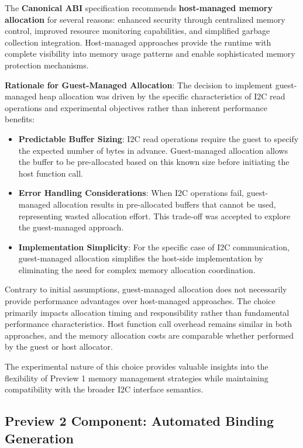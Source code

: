 The \textbf{Canonical ABI} specification recommends \textbf{host-managed memory allocation} for several reasons: enhanced security through centralized memory control, improved resource monitoring capabilities, and simplified garbage collection integration. Host-managed approaches provide the runtime with complete visibility into memory usage patterns and enable sophisticated memory protection mechanisms.

\textbf{Rationale for Guest-Managed Allocation}: The decision to implement guest-managed heap allocation was driven by the specific characteristics of I2C read operations and experimental objectives rather than inherent performance benefits:

\begin{itemize}
    \item \textbf{Predictable Buffer Sizing}: I2C read operations require the guest to specify the expected number of bytes in advance. Guest-managed allocation allows the buffer to be pre-allocated based on this known size before initiating the host function call.
    \item \textbf{Error Handling Considerations}: When I2C operations fail, guest-managed allocation results in pre-allocated buffers that cannot be used, representing wasted allocation effort. This trade-off was accepted to explore the guest-managed approach.
    \item \textbf{Implementation Simplicity}: For the specific case of I2C communication, guest-managed allocation simplifies the host-side implementation by eliminating the need for complex memory allocation coordination.
\end{itemize}

Contrary to initial assumptions, guest-managed allocation does not necessarily provide performance advantages over host-managed approaches. The choice primarily impacts allocation timing and responsibility rather than fundamental performance characteristics. Host function call overhead remains similar in both approaches, and the memory allocation costs are comparable whether performed by the guest or host allocator.

The experimental nature of this choice provides valuable insights into the flexibility of Preview 1 memory management strategies while maintaining compatibility with the broader I2C interface semantics.

\subsection{Preview 2 Component: Automated Binding Generation}

